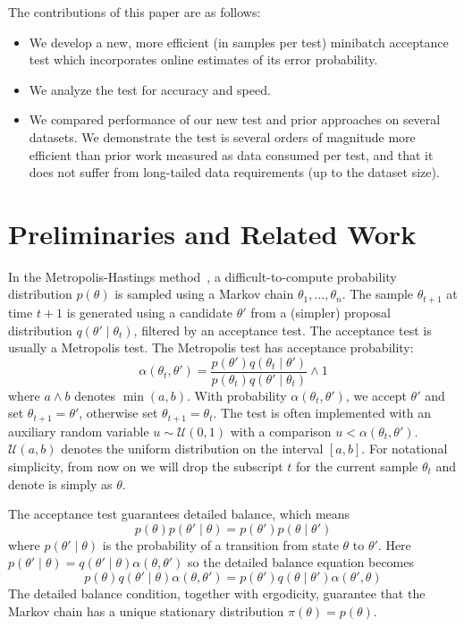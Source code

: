 \documentclass{article}
\begin{document}
The contributions of this paper are as follows:

\begin{itemize}
\item We develop a new, more efficient (in samples per test) minibatch acceptance test which incorporates
online  estimates of its error probability.
\item We analyze the test for accuracy and speed.
\item We compared performance of our new test and prior approaches on several datasets. We demonstrate the test is several orders
  of magnitude more efficient than prior work measured as data consumed per test, and that it does not suffer
  from long-tailed data requirements (up to the dataset size). 
\end{itemize}




\section{Preliminaries and Related Work}\label{sec:related_work}

In the Metropolis-Hastings method~\cite{gilks1996markov,brooks2011handbook}, a difficult-to-compute
probability distribution $p(\theta)$ is sampled using a Markov chain $\theta_1,\ldots,\theta_n$. The 
sample $\theta_{t+1}$ at time $t+1$ is generated using a candidate $\theta'$ from a (simpler) proposal
distribution $q(\theta'\mid \theta_t)$, filtered by an acceptance test. The acceptance test is usually
a Metropolis test. The Metropolis test has acceptance probability:
\begin{equation}\label{eq:traditional}
\alpha(\theta_t,\theta') = \frac{p(\theta')q(\theta_t \mid \theta')}{p(\theta_t)q(\theta' \mid \theta_t)} \wedge 1
\end{equation}
where $a \wedge b$ denotes $\min(a,b)$.  With probability $\alpha(\theta_t,\theta')$, we accept $\theta'$
and set $\theta_{t+1} = \theta'$, otherwise set
$\theta_{t+1}=\theta_t$.  The test is often implemented with an
auxiliary random variable $u \sim \mathcal{U}(0,1)$ with a comparison $u < \alpha(\theta_t,\theta')$. $\mathcal{U}(a,b)$ denotes the uniform distribution on the interval $[a,b]$. 
For notational simplicity, from now on we will drop the subscript $t$ for the current sample $\theta_t$ and
denote is simply as $\theta$. 


The acceptance test guarantees detailed balance, which means
\begin{equation}\label{detailed_balance1}
  p(\theta)p(\theta'\mid\theta) = p(\theta')p(\theta \mid\theta')
\end{equation}
where $p(\theta'\mid\theta)$ is the probability of a transition from state $\theta$ to $\theta'$. Here
$p(\theta'\mid\theta) = q(\theta'\mid\theta)\alpha(\theta,\theta')$ so the detailed balance equation becomes
\begin{equation}\label{detailed_balance2}
  p(\theta)q(\theta'\mid\theta)\alpha(\theta,\theta') = p(\theta')q(\theta\mid\theta')\alpha(\theta',\theta)
\end{equation}
The detailed balance condition, together with ergodicity, guarantee that the
Markov chain has a unique stationary distribution $\pi(\theta) = p(\theta)$.
\end{document}
